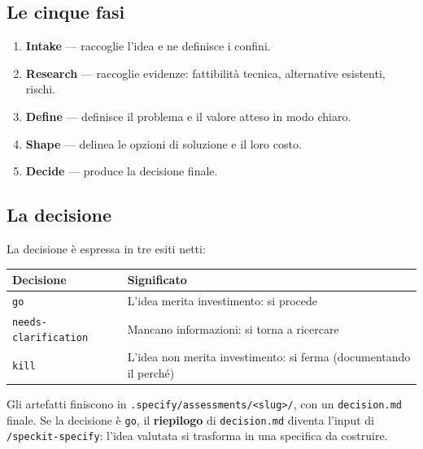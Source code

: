 \documentclass[
  italian,
  10pt,
]{book}
\newcounter{none} %
\providecommand{\tightlist}{%
  \setlength{\itemsep}{0pt}\setlength{\parskip}{0pt}}
\begin{document}
\subsection{Le cinque fasi}\label{le-cinque-fasi}

\begin{enumerate}
\def\labelenumi{\arabic{enumi}.}
\tightlist
\item
  \textbf{Intake} --- raccoglie l'idea e ne definisce i confini.
\item
  \textbf{Research} --- raccoglie evidenze: fattibilità tecnica,
  alternative esistenti, rischi.
\item
  \textbf{Define} --- definisce il problema e il valore atteso in modo
  chiaro.
\item
  \textbf{Shape} --- delinea le opzioni di soluzione e il loro costo.
\item
  \textbf{Decide} --- produce la decisione finale.
\end{enumerate}

\subsection{La decisione}\label{la-decisione}

La decisione è espressa in tre esiti netti:

{\def\LTcaptype{none} %
\begin{longtable}[]{@{}
  >{\raggedright\arraybackslash}p{}
  >{\raggedright\arraybackslash}p{}@{}}
\toprule\noalign{}
\begin{minipage}[b]{\linewidth}\raggedright
Decisione
\end{minipage} & \begin{minipage}[b]{\linewidth}\raggedright
Significato
\end{minipage} \\
\midrule\noalign{}
\endhead
\bottomrule\noalign{}
\endlastfoot
\texttt{go} & L'idea merita investimento: si procede \\
\texttt{needs-clarification} & Mancano informazioni: si torna a
ricercare \\
\texttt{kill} & L'idea non merita investimento: si ferma (documentando
il perché) \\
\end{longtable}
}

Gli artefatti finiscono in
\texttt{.specify/assessments/\textless{}slug\textgreater{}/}, con un
\texttt{decision.md} finale. Se la decisione è \texttt{go}, il
\textbf{riepilogo} di \texttt{decision.md} diventa l'input di
\texttt{/speckit-specify}: l'idea valutata si trasforma in una specifica
da costruire.
\end{document}
